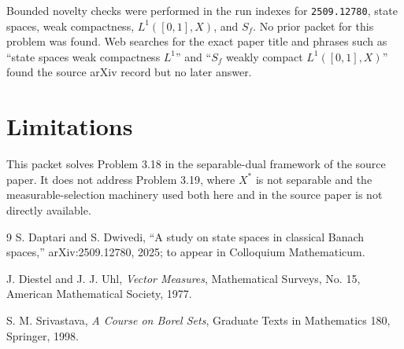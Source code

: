 \documentclass[11pt]{article}
\begin{document}
Bounded novelty checks were performed in the run indexes for
\texttt{2509.12780}, state spaces, weak compactness, \(L^1([0,1],X)\), and
\(S_f\). No prior packet for this problem was found. Web searches for the
exact paper title and phrases such as ``state spaces weak compactness
\(L^1\)'' and ``\(S_f\) weakly compact \(L^1([0,1],X)\)'' found the source
arXiv record but no later answer.

\section{Limitations}

This packet solves Problem 3.18 in the separable-dual framework of the source
paper. It does not address Problem 3.19, where \(X^*\) is not separable and
the measurable-selection machinery used both here and in the source paper is
not directly available.

\begin{thebibliography}{9}
S. Daptari and S. Dwivedi,
``A study on state spaces in classical Banach spaces,''
arXiv:2509.12780, 2025; to appear in Colloquium Mathematicum.

J. Diestel and J. J. Uhl,
\emph{Vector Measures},
Mathematical Surveys, No. 15, American Mathematical Society, 1977.

S. M. Srivastava,
\emph{A Course on Borel Sets},
Graduate Texts in Mathematics 180, Springer, 1998.
\end{thebibliography}
\end{document}
